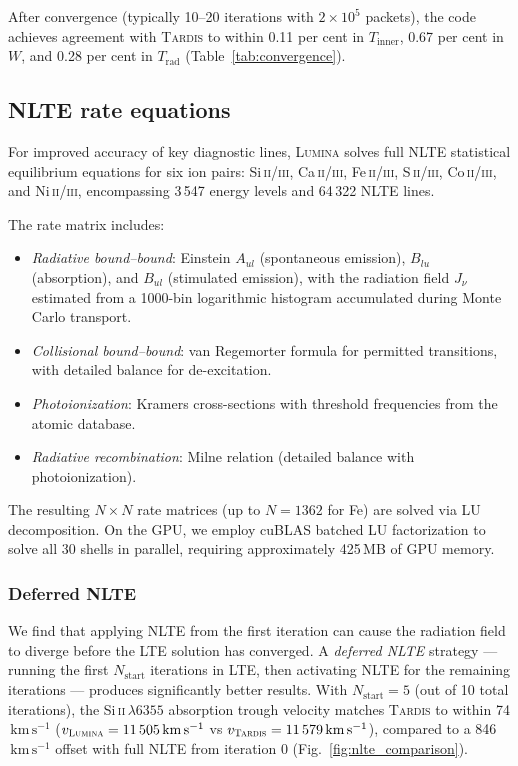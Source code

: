 \documentclass[fleqn,usenatbib]{mnras}
\newcommand{\lumina}{\textsc{Lumina}}
\newcommand{\tardis}{\textsc{Tardis}}
\newcommand{\kms}{\ensuremath{\,\mathrm{km\,s^{-1}}}}
\newcommand{\SiII}{Si\,\textsc{ii}}
\begin{document}
After convergence (typically 10--20 iterations with $2\times10^5$ packets), the code achieves agreement with \tardis{} to within 0.11 per cent in $T_\mathrm{inner}$, 0.67 per cent in $W$, and 0.28 per cent in $T_\mathrm{rad}$ (Table~\ref{tab:convergence}).

\subsection{NLTE rate equations}
\label{sec:nlte}

For improved accuracy of key diagnostic lines, \lumina{} solves full NLTE statistical equilibrium equations for six ion pairs: Si\,\textsc{ii/iii}, Ca\,\textsc{ii/iii}, Fe\,\textsc{ii/iii}, S\,\textsc{ii/iii}, Co\,\textsc{ii/iii}, and Ni\,\textsc{ii/iii}, encompassing 3\,547 energy levels and 64\,322 NLTE lines.

The rate matrix includes:
\begin{itemize}
    \item \textit{Radiative bound--bound}: Einstein $A_{ul}$ (spontaneous emission), $B_{lu}$ (absorption), and $B_{ul}$ (stimulated emission), with the radiation field $J_\nu$ estimated from a 1000-bin logarithmic histogram accumulated during Monte Carlo transport.
    \item \textit{Collisional bound--bound}: van Regemorter formula \citep{vanRegemorter1962} for permitted transitions, with detailed balance for de-excitation.
    \item \textit{Photoionization}: Kramers cross-sections with threshold frequencies from the atomic database.
    \item \textit{Radiative recombination}: Milne relation (detailed balance with photoionization).
\end{itemize}

The resulting $N \times N$ rate matrices (up to $N = 1362$ for Fe) are solved via LU decomposition. On the GPU, we employ cuBLAS batched LU factorization to solve all 30 shells in parallel, requiring approximately 425\,MB of GPU memory.

\subsubsection{Deferred NLTE}
\label{sec:deferred_nlte}

We find that applying NLTE from the first iteration can cause the radiation field to diverge before the LTE solution has converged. A \textit{deferred NLTE} strategy --- running the first $N_\mathrm{start}$ iterations in LTE, then activating NLTE for the remaining iterations --- produces significantly better results. With $N_\mathrm{start} = 5$ (out of 10 total iterations), the \SiII{}\,$\lambda 6355$ absorption trough velocity matches \tardis{} to within 74\kms{} ($v_\lumina = 11\,505\kms$ vs $v_\tardis = 11\,579\kms$), compared to a 846\kms{} offset with full NLTE from iteration 0 (Fig.~\ref{fig:nlte_comparison}).
\end{document}
